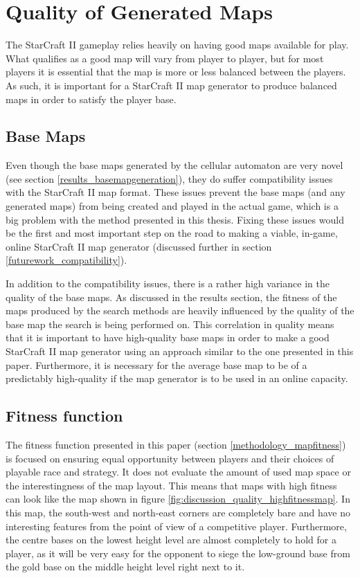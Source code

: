 \section{Quality of Generated Maps}
\label{discussion_quality}
The StarCraft II gameplay relies heavily on having good maps available for play. What qualifies as a good map will vary from player to player, but for most players it is essential that the map is more or less balanced between the players. As such, it is important for a StarCraft II map generator to produce balanced maps in order to satisfy the player base.

\subsection{Base Maps}
\label{discussion_quality_basemaps}
Even though the base maps generated by the cellular automaton are very novel (see section \ref{results_basemapgeneration}), they do suffer compatibility issues with the StarCraft II map format. These issues prevent the base maps (and any generated maps) from being created and played in the actual game, which is a big problem with the method presented in this thesis. Fixing these issues would be the first and most important step on the road to making a viable, in-game, online StarCraft II map generator (discussed further in section \ref{futurework_compatibility}).

In addition to the compatibility issues, there is a rather high variance in the quality of the base maps. As discussed in the results section, the fitness of the maps produced by the search methods are heavily influenced by the quality of the base map the search is being performed on. This correlation in quality means that it is important to have high-quality base maps in order to make a good StarCraft II map generator using an approach similar to the one presented in this paper. Furthermore, it is necessary for the average base map to be of a predictably high-quality if the map generator is to be used in an online capacity. 

\subsection{Fitness function}
\label{discussion_quality_fitnessfunction}
The fitness function presented in this paper (section \ref{methodology_mapfitness}) is focused on ensuring equal opportunity between players and their choices of playable race and strategy. It does not evaluate the amount of used map space or the interestingness of the map layout. This means that maps with high fitness can look like the map shown in figure \ref{fig:discussion_quality_highfitnessmap}. In this map, the south-west and north-east corners are completely bare and have no interesting features from the point of view of a competitive player. Furthermore, the centre bases on the lowest height level are almost completely to hold for a player, as it will be very easy for the opponent to siege the low-ground base from the gold base on the middle height level right next to it.

